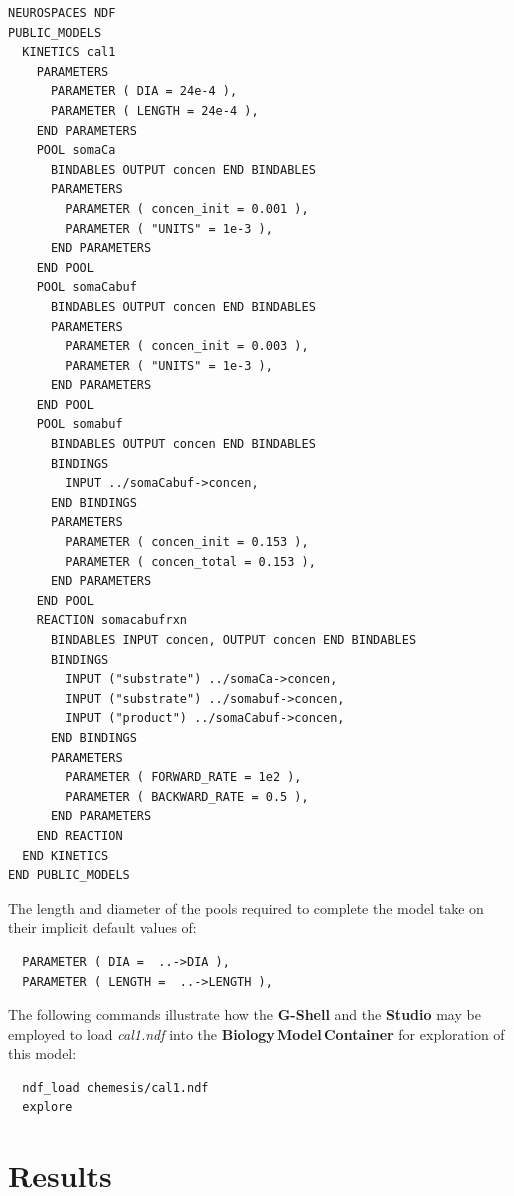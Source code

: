 \documentclass{article}
\begin{document}
\begin{verbatim}
NEUROSPACES NDF
PUBLIC_MODELS
  KINETICS cal1
    PARAMETERS
      PARAMETER ( DIA = 24e-4 ),
      PARAMETER ( LENGTH = 24e-4 ),
    END PARAMETERS
    POOL somaCa
      BINDABLES OUTPUT concen END BINDABLES
      PARAMETERS
        PARAMETER ( concen_init = 0.001 ),
        PARAMETER ( "UNITS" = 1e-3 ),
      END PARAMETERS
    END POOL
    POOL somaCabuf
      BINDABLES OUTPUT concen END BINDABLES
      PARAMETERS
        PARAMETER ( concen_init = 0.003 ),
        PARAMETER ( "UNITS" = 1e-3 ),
      END PARAMETERS
    END POOL
    POOL somabuf
      BINDABLES OUTPUT concen END BINDABLES
      BINDINGS
        INPUT ../somaCabuf->concen,
      END BINDINGS
      PARAMETERS
        PARAMETER ( concen_init = 0.153 ),
        PARAMETER ( concen_total = 0.153 ),
      END PARAMETERS
    END POOL
    REACTION somacabufrxn
      BINDABLES INPUT concen, OUTPUT concen END BINDABLES
      BINDINGS
        INPUT ("substrate") ../somaCa->concen,
        INPUT ("substrate") ../somabuf->concen,
        INPUT ("product") ../somaCabuf->concen,
      END BINDINGS
      PARAMETERS
        PARAMETER ( FORWARD_RATE = 1e2 ),
        PARAMETER ( BACKWARD_RATE = 0.5 ),
      END PARAMETERS
    END REACTION
  END KINETICS
END PUBLIC_MODELS
\end{verbatim}

The length and diameter of the pools required to complete the model
take on their implicit default values of:
\begin{verbatim}
  PARAMETER ( DIA =  ..->DIA ),
  PARAMETER ( LENGTH =  ..->LENGTH ),
\end{verbatim}

The following commands illustrate how the {\bf G-Shell} and the {\bf Studio} may be employed
to load  {\it cal1.ndf} into the {\bf Biology\,Model\,Container} for exploration of this model:

\begin{verbatim}
  ndf_load chemesis/cal1.ndf
  explore
\end{verbatim}

%

\section{Results}
\end{document}
